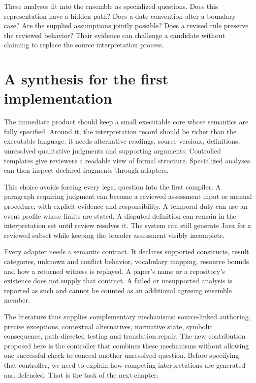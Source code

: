 \documentclass[12pt,a4paper,oneside,openany]{book}
\begin{document}
These analyses fit into the ensemble as specialized questions. Does this
representation have a hidden path? Does a date convention alter a boundary
case? Are the supplied assumptions jointly possible? Does a revised rule
preserve the reviewed behavior? Their evidence can challenge a candidate
without claiming to replace the source interpretation process.

\section{A synthesis for the first implementation}
\label{sec:languages-synthesis}
The immediate product should keep a small executable core whose semantics are
fully specified. Around it, the interpretation record should be richer than
the executable language: it needs alternative readings, source versions,
definitions, unresolved qualitative judgments and supporting arguments.
Controlled templates give reviewers a readable view of formal structure.
Specialized analyses can then inspect declared fragments through adapters.

This choice avoids forcing every legal question into the first compiler.
A paragraph requiring judgment can become a reviewed assessment input or
manual procedure, with explicit evidence and responsibility. A temporal duty
can use an event profile whose limits are stated. A disputed definition can
remain in the interpretation set until review resolves it. The system can
still generate Java for a reviewed subset while keeping the broader
assessment visibly incomplete.

Every adapter needs a semantic contract. It declares supported constructs,
result categories, unknown and conflict behavior, vocabulary mapping,
resource bounds and how a returned witness is replayed. A paper's name or
a repository's existence does not supply that contract. A failed or
unsupported analysis is reported as such and cannot be counted as an
additional agreeing ensemble member.

The literature thus supplies complementary mechanisms: source-linked
authoring, precise exceptions, contextual alternatives, normative state,
symbolic consequence, path-directed testing and translation repair. The
new contribution proposed here is the controller that combines these
mechanisms without allowing one successful check to conceal another
unresolved question. Before specifying that controller, we need to explain
how competing interpretations are generated and defended. That is the task
of the next chapter.
\end{document}
